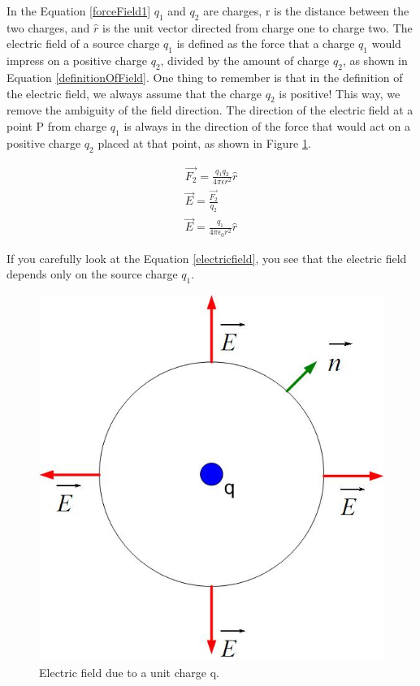 \documentclass{ximera}
\begin{document}
 In the Equation \ref{forceField1} $q_1$ and $q_2$ are charges, r is the distance between the two charges, and $\hat{r}$ is the unit vector directed  from charge one to charge two. The electric field of a source charge $q_1$ is defined as the force that a charge $q_1$ would impress on a positive charge $q_2$, divided by the amount of charge $q_2$, as shown in Equation \ref{definitionOfField}. One thing to remember is that in the definition of the electric field, we always assume that the charge $q_2$ is positive! This way, we remove the ambiguity of the field direction. The direction of the electric field at a point P from charge $q_1$ is always in the direction of the force that would act on a positive charge $q_2$ placed at that point, as shown in Figure \ref{UnitCh1}.


\begin{eqnarray}
\vec{F_2}=\frac{q_1 q_2}{4 \pi \epsilon r^2 } \hat{r} \label{forceField1}\\
\vec{E} = \frac{\vec{F_2}}{q_2} \label{definitionOfField} \\
\vec{E} =  \frac{q_1}{4 \pi \epsilon_0 r^2} \hat{r} \label{electricfield}
\end{eqnarray} 

If you carefully look at the Equation \ref{electricfield}, you see that the electric field depends only on the source charge $q_1$. 

\begin{figure}[htbp]
\begin{center}
\includegraphics[scale=0.5]{../jpg/unitchargefield.jpg}
\end{center}
\caption{Electric field due to a unit charge q.}
\label{UnitCh1}
\end{figure}
\end{document}
